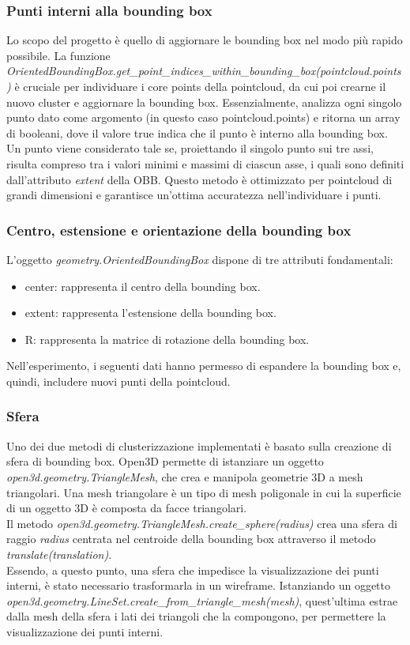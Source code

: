 \documentclass[italian]{article}
\begin{document}
\subsubsection*{Punti interni alla bounding box}
Lo scopo del progetto è quello di aggiornare le bounding box nel modo più rapido possibile. La funzione \textit{OrientedBoundingBox.get\_point\_indices\_within\_bounding\_box(pointcloud.points)} è cruciale per individuare i core points della pointcloud, da cui poi crearne il nuovo cluster e aggiornare la bounding box. Essenzialmente, analizza ogni singolo punto dato come argomento (in questo caso pointcloud.points) e ritorna un array di booleani, dove il valore true indica che il punto è interno alla bounding box. Un punto viene considerato tale se, proiettando il singolo punto sui tre assi, risulta compreso tra i valori minimi e massimi di ciascun asse, i quali sono definiti dall'attributo \textit{extent} della OBB.
Questo metodo è ottimizzato per pointcloud di grandi dimensioni e garantisce un'ottima accuratezza nell'individuare i punti.
\subsubsection*{Centro, estensione e orientazione della bounding box}
L'oggetto \textit{geometry.OrientedBoundingBox} dispone di tre attributi fondamentali:
\begin{itemize}
	\item center: rappresenta il centro della bounding box.
	\item extent: rappresenta l'estensione della bounding box.
	\item R: rappresenta la matrice di rotazione della bounding box.
\end{itemize}
Nell'esperimento, i seguenti dati hanno permesso di espandere la bounding box e, quindi, includere nuovi punti della pointcloud.
\subsubsection{Sfera}
Uno dei due metodi di clusterizzazione implementati è basato sulla creazione di sfera di bounding box. Open3D permette di istanziare un oggetto \textit{open3d.geometry.TriangleMesh}, che crea e manipola geometrie 3D a mesh triangolari. Una mesh triangolare è un tipo di mesh poligonale in cui la superficie di un oggetto 3D è composta da facce triangolari.\\
Il metodo \textit{open3d.geometry.TriangleMesh.create\_sphere(radius)} crea una sfera di raggio \textit{radius} centrata nel centroide della bounding box attraverso il metodo \textit{translate(translation)}.\\
Essendo, a questo punto, una sfera che impedisce la visualizzazione dei punti interni, è stato necessario trasformarla in un wireframe. Istanziando un oggetto \textit{open3d.geometry.LineSet.create\_from\_triangle\_mesh(mesh)}, quest'ultima estrae dalla mesh della sfera i lati dei triangoli che la compongono, per permettere la visualizzazione dei punti interni.\\
\end{document}
